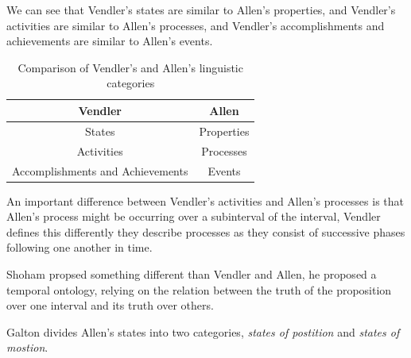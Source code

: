 We can see that Vendler's states are similar to Allen's properties, and Vendler's activities are similar to Allen's processes, and Vendler's accomplishments and achievements are similar to Allen's events.

\begin{table}[h]
\centering
\begin{tabular}{|c|c|}
\hline
\textbf{Vendler} & \textbf{Allen} \\
\hline
States & Properties \\
Activities & Processes \\
Accomplishments and Achievements & Events \\
\hline
\end{tabular}
\caption{Comparison of Vendler's and Allen's linguistic categories}
\label{tab:comparison}
\end{table}

An important difference between Vendler's activities and Allen's processes is that Allen's process might be occurring over a subinterval of the interval,
Vendler defines this differently they describe processes as they consist of successive phases following one another in time.


Shoham propsed something different than Vendler and Allen, he proposed a temporal ontology, relying on the relation between the truth of the proposition
over one interval and its truth over others.

Galton divides Allen's states into two categories, \textit{states of postition} and \textit{states of mostion}.
